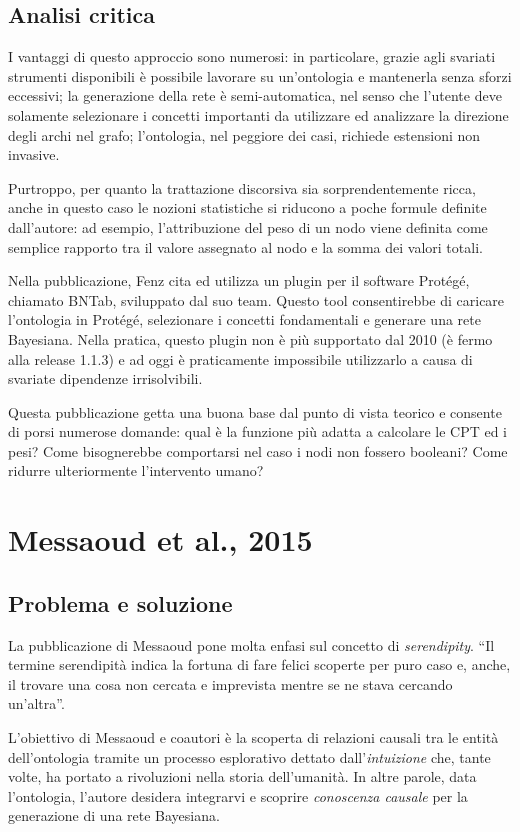 \subsection{Analisi critica}
I vantaggi di questo approccio sono numerosi: in particolare, grazie agli svariati strumenti disponibili è possibile lavorare su un'ontologia e mantenerla senza sforzi eccessivi; la generazione della rete è semi-automatica, nel senso che l'utente deve solamente selezionare i concetti importanti da utilizzare ed analizzare la direzione degli archi nel grafo; l'ontologia, nel peggiore dei casi, richiede estensioni non invasive.

Purtroppo, per quanto la trattazione discorsiva sia sorprendentemente ricca, anche in questo caso le nozioni statistiche si riducono a poche formule definite dall'autore: ad esempio, l'attribuzione del peso di un nodo viene definita come semplice rapporto tra il valore assegnato al nodo e la somma dei valori totali.

Nella pubblicazione, Fenz cita ed utilizza un plugin per il software Protégé\cite{protege}, chiamato BNTab\cite{bntab}, sviluppato dal suo team. Questo tool consentirebbe di caricare l'ontologia in Protégé, selezionare i concetti fondamentali e generare una rete Bayesiana. Nella pratica, questo plugin non è più supportato dal 2010 (è fermo alla release 1.1.3) e ad oggi è praticamente impossibile utilizzarlo a causa di svariate dipendenze irrisolvibili. 

Questa pubblicazione getta una buona base dal punto di vista teorico e consente di porsi numerose domande: qual è la funzione più adatta a calcolare le CPT ed i pesi? Come bisognerebbe comportarsi nel caso i nodi non fossero booleani? Come ridurre ulteriormente l'intervento umano?


\section{Messaoud et al., 2015}
\subsection{Problema e soluzione}
La pubblicazione di Messaoud\cite{messaoud2015} pone molta enfasi sul concetto di \textit{serendipity}. ``Il termine serendipità indica la fortuna di fare felici scoperte per puro caso e, anche, il trovare una cosa non cercata e imprevista mentre se ne stava cercando un'altra''\cite{serendipity_wiki}.

L'obiettivo di Messaoud e coautori è la scoperta di relazioni causali tra le entità dell'ontologia tramite un processo esplorativo dettato dall'\textit{intuizione} che, tante volte, ha portato a rivoluzioni nella storia dell'umanità.
In altre parole, data l'ontologia, l'autore desidera integrarvi e scoprire \textit{conoscenza causale} per la generazione di una rete Bayesiana.

